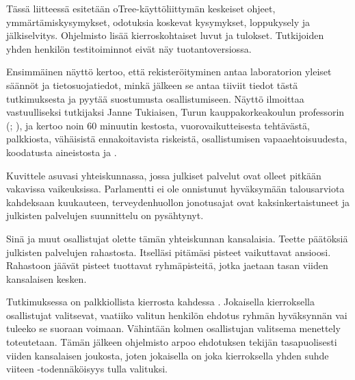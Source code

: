 
\renewcommand{\StudyTitle}{\StudyTitleFI}
\setlength{\emergencystretch}{2em}


Tässä liitteessä esitetään oTree-käyttöliittymän keskeiset ohjeet, ymmärtämiskysymykset, odotuksia koskevat kysymykset, loppukysely ja jälkiselvitys. Ohjelmisto lisää kierroskohtaiset luvut ja tulokset. Tutkijoiden yhden henkilön testitoiminnot eivät näy tuotantoversiossa.

Ensimmäinen näyttö kertoo, että  rekisteröityminen antaa laboratorion yleiset säännöt ja tietosuojatiedot, minkä jälkeen se antaa tiiviit tiedot tästä tutkimuksesta ja pyytää suostumusta osallistumiseen. Näyttö ilmoittaa vastuulliseksi tutkijaksi Janne Tukiaisen, Turun kauppakorkeakoulun professorin (\StudyEmail; \StudyPhone), ja kertoo noin 60 minuutin kestosta, vuorovaikutteisesta tehtävästä, palkkiosta, vähäisistä ennakoitavista riskeistä, osallistumisen vapaaehtoisuudesta, koodatusta aineistosta ja .

Kuvittele asuvasi yhteiskunnassa, jossa julkiset palvelut ovat olleet pitkään vakavissa vaikeuksissa. Parlamentti ei ole onnistunut hyväksymään talousarviota kahdeksaan kuukauteen, terveydenhuollon jonotusajat ovat kaksinkertaistuneet ja julkisten palvelujen suunnittelu on pysähtynyt.

Sinä ja muut osallistujat olette tämän yhteiskunnan kansalaisia. Teette päätöksiä julkisten palvelujen rahastosta. Itselläsi pitämäsi pisteet vaikuttavat ansioosi. Rahastoon jäävät pisteet tuottavat ryhmäpisteitä, jotka jaetaan tasan viiden kansalaisen kesken.

Tutkimuksessa on  palkkiollista kierrosta kahdessa . Jokaisella kierroksella osallistujat valitsevat, vaatiiko valitun henkilön ehdotus ryhmän hyväksynnän vai tuleeko se suoraan voimaan. Vähintään kolmen osallistujan valitsema menettely toteutetaan. Tämän jälkeen ohjelmisto arpoo ehdotuksen tekijän tasapuolisesti viiden kansalaisen joukosta, joten jokaisella on joka kierroksella yhden suhde viiteen -todennäköisyys tulla valituksi.


